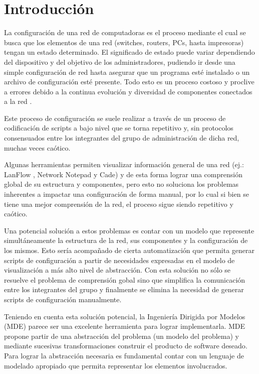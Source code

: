 \chapter{Introducción}

La configuración de una red de computadoras es el proceso mediante el cual se busca que los elementos de una red (switches, routers, PCs, hasta impresoras) tengan un estado determinado. El significado de estado puede variar dependiendo del dispositivo y del objetivo de los administradores, pudiendo ir desde una simple configuración de red hasta asegurar que un programa esté instalado o un archivo de configuración esté presente.
Todo esto es un proceso costoso y proclive a errores debido a la continua evolución y diversidad de componentes conectados a la red \cite{cmscost}.

Este proceso de configuración se suele realizar a través de un proceso de codificación de scripts a bajo nivel que se torna repetitivo y, sin protocolos consensuados entre los integrantes del grupo de administración de dicha red, muchas veces caótico.

Algunas herramientas permiten visualizar información general de una red (ej.: LanFlow \cite{lanflow}, Network Notepad\cite{networknotepad} y Cade) y de esta forma lograr una comprensión global de su estructura y componentes, pero esto no soluciona los problemas inherentes a impactar una configuración de forma manual, por lo cual si bien se tiene una mejor comprensión de la red, el proceso sigue siendo repetitivo y caótico.

Una potencial solución a estos problemas es contar con un modelo que represente simultáneamente la estructura de la red, sus componentes y la configuración de los mismos. Esto sería acompañado de cierta automatización que permita generar scripts de configuración a partir de necesidades expresadas en el modelo de visualización a más alto nivel de abstracción.
Con esta solución no sólo se resuelve el problema de comprensión gobal sino que simplifica la comunicación entre los integrantes del grupo y finalmente se elimina la necesidad de generar scripts de configuración manualmente.

Teniendo en cuenta esta solución potencial, la Ingeniería Dirigida por Modelos (MDE) parece ser una excelente herramienta para lograr implementarla. MDE propone partir de una abstracción del problema (un modelo del problema) y mediante sucesivas transformaciones construir el producto de software deseado\cite{kent2002model}. Para lograr la abstracción necesaria es fundamental contar con un lenguaje de modelado apropiado que permita representar los elementos involucrados.


